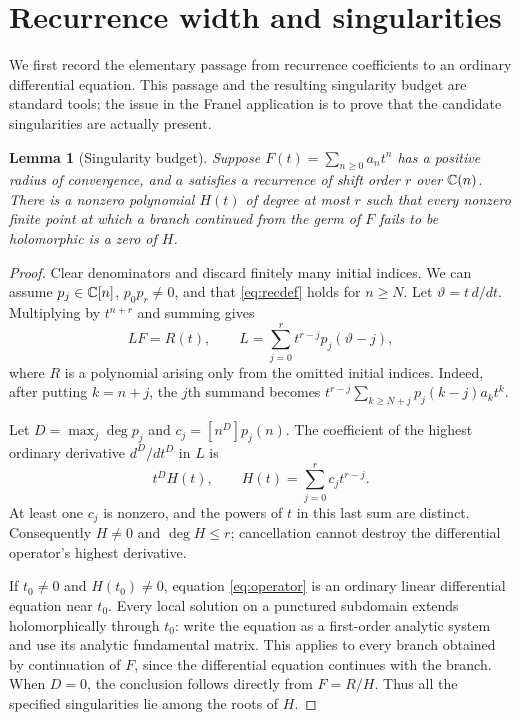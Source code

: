 \documentclass[11pt,a4paper]{article}
\newtheorem{lemma}[theorem]{Lemma}
\theoremstyle{definition}\newtheorem{definition}[theorem]{Definition}
\theoremstyle{remark}\newtheorem{remark}[theorem]{Remark}
\begin{document}
\section{Recurrence width and singularities}\label{sec:budget}
We first record the elementary passage from recurrence coefficients to an
ordinary differential equation. This passage and the resulting singularity
budget are standard tools; the issue in the Franel application is to prove
that the candidate singularities are actually present.

\begin{lemma}[Singularity budget]\label{lem:budget}
Suppose $F(t)=\sum_{n\ge0}a_nt^n$ has a positive radius of convergence, and
$a$ satisfies a recurrence of shift order $r$ over $\mathbb C(n)$. There is a nonzero
polynomial $H(t)$ of degree at most $r$ such that every nonzero finite point at
which a branch continued from the germ of $F$ fails to be holomorphic is a zero
of $H$.
\end{lemma}
\begin{proof}
Clear denominators and discard finitely many initial indices. We can assume
$p_j\in\mathbb C[n]$, $p_0p_r\ne0$, and that \eqref{eq:recdef} holds for $n\ge N$.
Let $\vartheta=t\,d/dt$. Multiplying by $t^{n+r}$ and summing gives
\begin{equation}\label{eq:operator}
 LF=R(t),\qquad
 L=\sum_{j=0}^{r}t^{r-j}p_j(\vartheta-j),
\end{equation}
where $R$ is a polynomial arising only from the omitted initial indices.
Indeed, after putting $k=n+j$, the $j$th summand becomes
$t^{r-j}\sum_{k\ge N+j}p_j(k-j)a_kt^k$.

Let $D=\max_j\deg p_j$ and $c_j=[n^D]p_j(n)$. The coefficient of the highest
ordinary derivative $d^D/dt^D$ in $L$ is
\begin{equation}\label{eq:Hbudget}
 t^D H(t),\qquad H(t)=\sum_{j=0}^{r}c_jt^{r-j}.
\end{equation}
At least one $c_j$ is nonzero, and the powers of $t$ in this last sum are
distinct. Consequently $H\ne0$ and $\deg H\le r$; cancellation cannot destroy
the differential operator's highest derivative.

If $t_0\ne0$ and $H(t_0)\ne0$, equation \eqref{eq:operator} is an ordinary
linear differential equation near $t_0$. Every local solution on a punctured
subdomain extends holomorphically through $t_0$: write the equation as a
first-order analytic system and use its analytic fundamental matrix. This
applies to every branch obtained by continuation of $F$, since the differential
equation continues with the branch. When $D=0$, the conclusion follows directly
from $F=R/H$. Thus all the specified singularities lie among the roots of $H$.
\end{proof}
\end{document}
